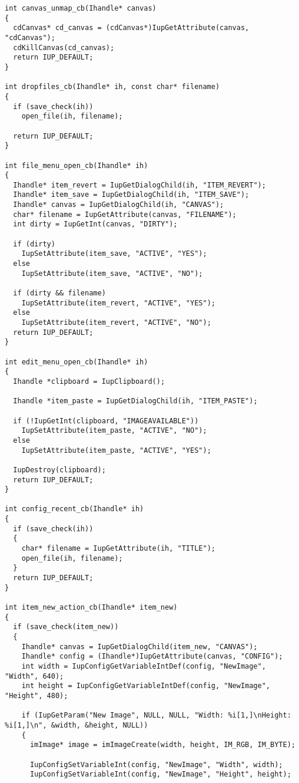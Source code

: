 \documentclass{ctexart}
\begin{document}
\begin{lstlisting}
int canvas_unmap_cb(Ihandle* canvas)
{
  cdCanvas* cd_canvas = (cdCanvas*)IupGetAttribute(canvas, "cdCanvas");
  cdKillCanvas(cd_canvas);
  return IUP_DEFAULT;
}

int dropfiles_cb(Ihandle* ih, const char* filename)
{
  if (save_check(ih))
    open_file(ih, filename);

  return IUP_DEFAULT;
}

int file_menu_open_cb(Ihandle* ih)
{
  Ihandle* item_revert = IupGetDialogChild(ih, "ITEM_REVERT");
  Ihandle* item_save = IupGetDialogChild(ih, "ITEM_SAVE");
  Ihandle* canvas = IupGetDialogChild(ih, "CANVAS");
  char* filename = IupGetAttribute(canvas, "FILENAME");
  int dirty = IupGetInt(canvas, "DIRTY");

  if (dirty)
    IupSetAttribute(item_save, "ACTIVE", "YES");
  else
    IupSetAttribute(item_save, "ACTIVE", "NO");

  if (dirty && filename)
    IupSetAttribute(item_revert, "ACTIVE", "YES");
  else
    IupSetAttribute(item_revert, "ACTIVE", "NO");
  return IUP_DEFAULT;
}

int edit_menu_open_cb(Ihandle* ih)
{
  Ihandle *clipboard = IupClipboard(); 

  Ihandle *item_paste = IupGetDialogChild(ih, "ITEM_PASTE");

  if (!IupGetInt(clipboard, "IMAGEAVAILABLE"))
    IupSetAttribute(item_paste, "ACTIVE", "NO");
  else
    IupSetAttribute(item_paste, "ACTIVE", "YES");

  IupDestroy(clipboard);
  return IUP_DEFAULT;
}

int config_recent_cb(Ihandle* ih)
{
  if (save_check(ih))
  {
    char* filename = IupGetAttribute(ih, "TITLE");
    open_file(ih, filename);
  }
  return IUP_DEFAULT;
}

int item_new_action_cb(Ihandle* item_new)
{
  if (save_check(item_new))
  {
    Ihandle* canvas = IupGetDialogChild(item_new, "CANVAS");
    Ihandle* config = (Ihandle*)IupGetAttribute(canvas, "CONFIG");
    int width = IupConfigGetVariableIntDef(config, "NewImage", "Width", 640);
    int height = IupConfigGetVariableIntDef(config, "NewImage", "Height", 480);

    if (IupGetParam("New Image", NULL, NULL, "Width: %i[1,]\nHeight: %i[1,]\n", &width, &height, NULL))
    {
      imImage* image = imImageCreate(width, height, IM_RGB, IM_BYTE);

      IupConfigSetVariableInt(config, "NewImage", "Width", width);
      IupConfigSetVariableInt(config, "NewImage", "Height", height);


\end{lstlisting}
\end{document}
